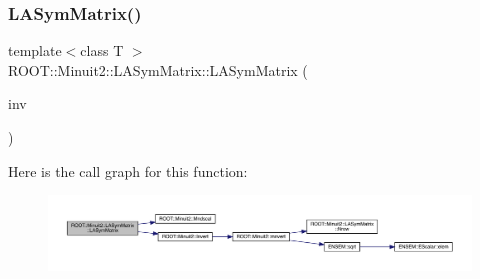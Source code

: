 \subsubsection{\texorpdfstring{LASymMatrix()}{LASymMatrix()}\hspace{0.1cm}{\footnotesize\ttfamily [7/30]}}
{\footnotesize\ttfamily template$<$class T $>$ \\
R\+O\+O\+T\+::\+Minuit2\+::\+L\+A\+Sym\+Matrix\+::\+L\+A\+Sym\+Matrix (\begin{DoxyParamCaption}\item[{const \mbox{\hyperlink{classROOT_1_1Minuit2_1_1ABObj}{A\+B\+Obj}}$<$ \mbox{\hyperlink{classROOT_1_1Minuit2_1_1sym}{sym}}, \mbox{\hyperlink{classROOT_1_1Minuit2_1_1MatrixInverse}{Matrix\+Inverse}}$<$ \mbox{\hyperlink{classROOT_1_1Minuit2_1_1sym}{sym}}, \mbox{\hyperlink{classROOT_1_1Minuit2_1_1ABObj}{A\+B\+Obj}}$<$ \mbox{\hyperlink{classROOT_1_1Minuit2_1_1sym}{sym}}, \mbox{\hyperlink{classROOT_1_1Minuit2_1_1LASymMatrix}{L\+A\+Sym\+Matrix}}, T $>$, T $>$, T $>$ \&}]{inv }\end{DoxyParamCaption})\hspace{0.3cm}{\ttfamily [inline]}}

Here is the call graph for this function\+:
\nopagebreak
\begin{figure}[H]
\begin{center}
\leavevmode
\includegraphics[width=350pt]{d3/d72/classROOT_1_1Minuit2_1_1LASymMatrix_a0089b4055d0d08767d7072657b6f87d5_cgraph}
\end{center}
\end{figure}
\mbox{\label{classROOT_1_1Minuit2_1_1LASymMatrix_a50ecd9916b1ca8941c767d16dbdb9b65}} 
